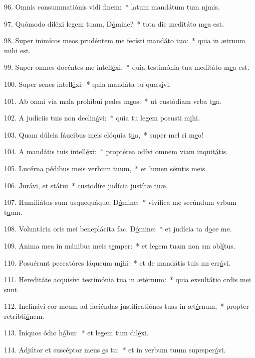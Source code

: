 96. Omnis consummatiónis vidi f\uline{i}nem:~* latum mandátum tum n\uline{i}mis.\par 
97. Quómodo diléxi legem tuam, D\uline{ó}mine?~* tota die meditáto m\uline{e}a est.\par 
98. Super inimícos meos prudéntem me fecísti mandáto t\uline{u}o:~* quia in ætrnum m\uline{i}hi est.\par 
99. Super omnes docéntes me intell\uline{é}xi:~* quia testimónia tua meditáto m\uline{e}a est.\par 
100. Super senes intell\uline{é}xi:~* quia mandáta tu quæs\uline{í}vi.\par 
101. Ab omni via mala prohíbui pedes m\uline{e}os:~* ut custódiam vrba t\uline{u}a.\par 
102. A judíciis tuis non declin\uline{á}vi:~* quia tu legem posusti m\uline{i}hi.\par 
103. Quam dúlcia fáucibus meis elóquia t\uline{u}a,~* super mel ri m\uline{e}o!\par 
104. A mandátis tuis intell\uline{é}xi:~* proptérea odívi omnem viam inquit\uline{á}tis.\par 
105. Lucérna pédibus meis verbum t\uline{u}um,~* et lumen sémtis m\uline{e}is.\par 
106. Jurávi, et st\uline{á}tui~* custodíre judícia justítæ t\uline{u}æ.\par 
107. Humiliátus sum usquequáque, D\uline{ó}mine:~* vivífica me secúndum vrbum t\uline{u}um.\par 
108. Voluntária oris mei beneplácita fac, D\uline{ó}mine:~* et judícia ta d\uline{o}ce me.\par 
109. Anima mea in mánibus meis s\uline{e}mper:~* et legem tuam non sm obl\uline{í}tus.\par 
110. Posuérunt peccatóres láqueum m\uline{i}hi:~* et de mandátis tuis nn err\uline{á}vi.\par 
111. Hereditáte acquisívi testimónia tua in æt\uline{é}rnum:~* quia exsultátio crdis m\uline{e}i sunt.\par 
112. Inclinávi cor meum ad faciéndas justificatiónes tuas in æt\uline{é}rnum,~* propter retribti\uline{ó}nem.\par 
113. Iníquos ódio h\uline{á}bui:~* et legem tum dil\uline{é}xi.\par 
114. Adjútor et suscéptor meus \uline{e}s tu:~* et in verbum tuum suprsper\uline{á}vi.\par 
